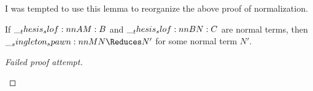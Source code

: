 I was tempted to use this lemma to reorganize the above proof of normalization.
%
\begin{theorem}
  If $\slof{A |- M : B}$ and $\slof{B |- N : C}$ are normal terms, then $\spawn{M}{N} \Reduces N'$ for some normal term $N'$.
\end{theorem}
%
\begin{proof}[Failed proof attempt]
  \begin{description}




\end{description}
\end{proof}
